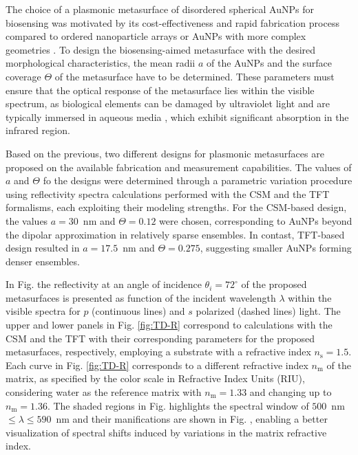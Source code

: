 
The choice of a plasmonic metasurface of disordered spherical AuNPs for biosensing was motivated by its cost-effectiveness and rapid fabrication process compared to ordered nanoparticle arrays or AuNPs with more complex geometries \cite{estevez_trends_2014,kabashin_label-free_2023}. To design the biosensing-aimed metasurface with the desired morphological characteristics, the mean radii $a$ of the AuNPs and the surface coverage $\Theta$ of the metasurface have to be determined. These parameters  must ensure that the optical response of the metasurface lies within the visible spectrum, as biological elements can be damaged by ultraviolet light and are typically immersed in aqueous media \cite{estevez_trends_2014}, which exhibit significant absorption in the infrared region.

Based on the previous, two different designs for plasmonic metasurfaces are proposed  on the available fabrication and measurement capabilities. The values of $a$ and $\Theta$ fo the designs were determined through a parametric variation procedure using reflectivity spectra calculations performed with the CSM and the TFT formalisms, each exploiting their modeling strengths. For the CSM-based design, the values $a = 30$~nm and $\Theta = 0.12$ were chosen, corresponding to AuNPs beyond the dipolar approximation in relatively sparse  ensembles. In contast, TFT-based  design resulted in $a=17.5$~nm and $\Theta=0.275$, suggesting smaller AuNPs forming denser ensembles.

In Fig.  the reflectivity  at an angle of incidence $\theta_i = 72^\circ$ of the proposed metasurfaces is presented as function of the incident wavelength $\lambda$ within the visible spectra for $p$ (continuous lines)  and $s$ polarized (dashed lines) light. The upper and lower panels in Fig. \ref{fig:TD-R} correspond to calculations with the CSM and the TFT with their corresponding parameters for the proposed metasurfaces, respectively, employing a substrate with a refractive index $n_\text{s} = 1.5$. Each curve in Fig. \ref{fig:TD-R} corresponds to a different refractive index $n_\text{m}$ of the matrix, as specified by the color scale in Refractive Index Units (RIU), considering  water as the reference matrix with $n_\text{m} = 1.33$ and changing up to $n_\text{m} = 1.36$. The shaded regions in Fig.  highlights the spectral window of $500$~nm $\leq \lambda \leq 590$~nm and their manifications are shown in Fig.  , enabling a better visualization of spectral shifts induced by variations in the matrix refractive index.

